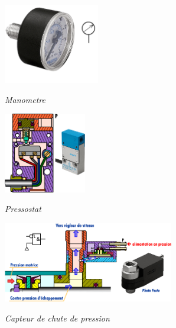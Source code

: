 \documentclass[10pt]{article}
\begin{document}
\begin{minipage}[c]{.2\linewidth}
\begin{center}
\includegraphics[height=3.5cm]{images/Manometre}

\textit{Manometre}
\end{center}
\end{minipage}\hfill
\begin{minipage}[c]{.2\linewidth}
\begin{center}
\includegraphics[height=3.5cm]{images/Pressostat}

\textit{Pressostat}
\end{center}
\end{minipage}\hfill
\begin{minipage}[c]{.55\linewidth}
\begin{center}
\includegraphics[height=3.5cm]{images/CapteurChute}

\textit{Capteur de chute de pression}
\end{center}
\end{minipage}
\end{document}

